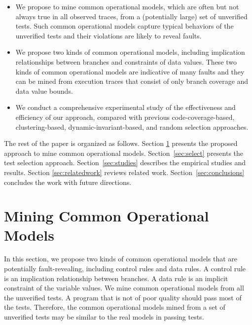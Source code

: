 \documentclass{sig-alternate}
\begin{document}
\begin{itemize}
\item
We propose to mine common operational models, which are often but
not always true in all observed traces, from a (potentially large)
set of unverified tests. Such common operational models capture
typical behaviors of the unverified tests and their violations are
likely to reveal faults.


\item
We propose two kinds of common operational models, including
implication relationships between branches and constraints of data
values. These two kinds of common operational models are indicative
of many faults and they can be mined from execution traces that
consist of only branch coverage and data value bounds.


\item

We conduct a comprehensive experimental study of the effectiveness
and efficiency of our approach, compared with previous
code-coverage-based, clustering-based, dynamic-invariant-based, and
random selection approaches.


\end{itemize}



The rest of the paper is organized as follows. Section
\ref{sec:common} presents the proposed approach to mine common
operational models. Section~\ref{sec:select} presents the test
selection approach. Section~\ref{sec:studies} describes the
empirical studies and results. Section \ref{sec:relatedwork} reviews
related work. Section~\ref{sec:conclusions} concludes the work with
future directions.








\section{Mining Common Operational Models} \label{sec:common}

In this section, we propose two kinds of common operational models
that are potentially fault-revealing, including control rules and
data rules. A control rule is an implication relationship between
branches. A data rule is an implicit constraint of the variable
values. We mine common operational models from all the unverified
tests. A program that is not of poor quality should pass most of the
tests. Therefore, the common operational models mined from a set of
unverified tests may be similar to the real models in passing tests.
\end{document}
